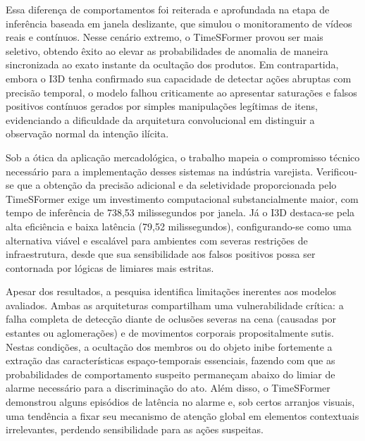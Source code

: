 \documentclass[12pt, %
openright, 
oneside, %
a4paper,    %
brazil]{facom-ufu-abntex2}
\begin{document}
Essa diferença de comportamentos foi reiterada e aprofundada na etapa de inferência baseada em janela deslizante, que simulou o monitoramento de vídeos reais e contínuos. Nesse cenário extremo, o TimeSFormer provou ser mais seletivo, obtendo êxito ao elevar as probabilidades de anomalia de maneira sincronizada ao exato instante da ocultação dos produtos. Em contrapartida, embora o I3D tenha confirmado sua capacidade de detectar ações abruptas com precisão temporal, o modelo falhou criticamente ao apresentar saturações e falsos positivos contínuos gerados por simples manipulações legítimas de itens, evidenciando a dificuldade da arquitetura convolucional em distinguir a observação normal da intenção ilícita.

Sob a ótica da aplicação mercadológica, o trabalho mapeia o compromisso técnico necessário para a implementação desses sistemas na indústria varejista. Verificou-se que a obtenção da precisão adicional e da seletividade proporcionada pelo TimeSFormer exige um investimento computacional substancialmente maior, com tempo de inferência de 738,53 milissegundos por janela. Já o I3D destaca-se pela alta eficiência e baixa latência (79,52 milissegundos), configurando-se como uma alternativa viável e escalável para ambientes com severas restrições de infraestrutura, desde que sua sensibilidade aos falsos positivos possa ser contornada por lógicas de limiares mais estritas. 

Apesar dos resultados, a pesquisa identifica limitações inerentes aos modelos avaliados. Ambas as arquiteturas compartilham uma vulnerabilidade crítica: a falha completa de detecção diante de oclusões severas na cena (causadas por estantes ou aglomerações) e de movimentos corporais propositalmente sutis. Nestas condições, a ocultação dos membros ou do objeto inibe fortemente a extração das características espaço-temporais essenciais, fazendo com que as probabilidades de comportamento suspeito permaneçam abaixo do limiar de alarme necessário para a discriminação do ato. Além disso, o TimeSFormer demonstrou alguns episódios de latência no alarme e, sob certos arranjos visuais, uma tendência a fixar seu mecanismo de atenção global em elementos contextuais irrelevantes, perdendo sensibilidade para as ações suspeitas.
\end{document}
